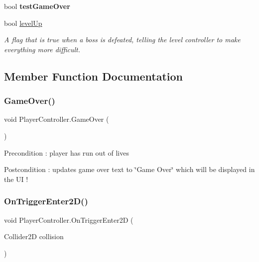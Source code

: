 \begin{DoxyCompactItemize}
\mbox{\label{class_player_controller_a96474cb76d48047171329a05522f12a3}} 
bool {\bfseries test\+Game\+Over}
\item 
\mbox{\label{class_player_controller_a40ca018dd43b840f93242df83148ee37}} 
bool \mbox{\hyperlink{class_player_controller_a40ca018dd43b840f93242df83148ee37}{level\+Up}}
\begin{DoxyCompactList}\small\item\em A flag that is true when a boss is defeated, telling the level controller to make everything more difficult. \end{DoxyCompactList}\end{DoxyCompactItemize}


\subsection{Member Function Documentation}
\mbox{\label{class_player_controller_a022c877a529497a8fdb3fcf7e21cf090}} 
\subsubsection{\texorpdfstring{GameOver()}{GameOver()}}
{\footnotesize\ttfamily void Player\+Controller.\+Game\+Over (\begin{DoxyParamCaption}{ }\end{DoxyParamCaption})}

\begin{DoxyPrecond}{Precondition}
\+: player has run out of lives 
\end{DoxyPrecond}
\begin{DoxyPostcond}{Postcondition}
\+: updates game over text to \char`\"{}\+Game Over\char`\"{} which will be displayed in the UI ! 
\end{DoxyPostcond}
\mbox{\label{class_player_controller_a9cb907e7cb020bfa04ef52f158aa6fcb}} 
\subsubsection{\texorpdfstring{OnTriggerEnter2D()}{OnTriggerEnter2D()}}
{\footnotesize\ttfamily void Player\+Controller.\+On\+Trigger\+Enter2D (\begin{DoxyParamCaption}\item[{Collider2D}]{collision }\end{DoxyParamCaption})}

